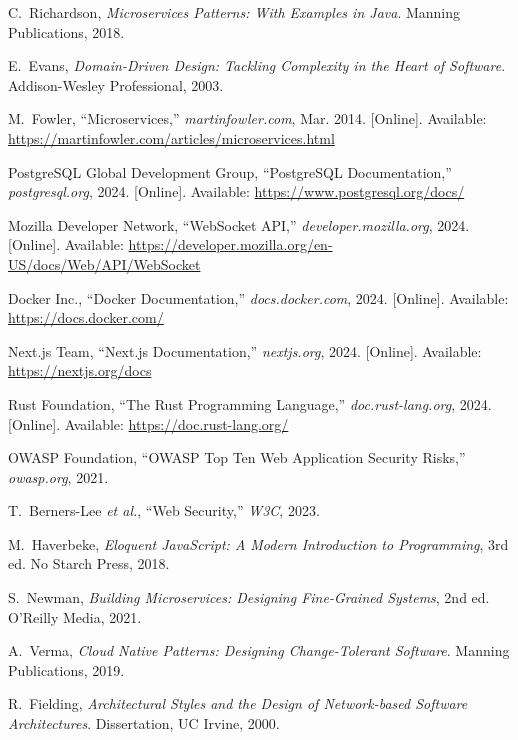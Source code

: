 \documentclass{rapportPfe}
\begin{document}
\newpage


\begin{thebibliography}{21}

C.~Richardson, \textit{Microservices Patterns: With Examples in Java}. Manning Publications, 2018.

E.~Evans, \textit{Domain-Driven Design: Tackling Complexity in the Heart of Software}. Addison-Wesley Professional, 2003.

M.~Fowler, ``Microservices,'' \textit{martinfowler.com}, Mar. 2014. [Online]. Available: \url{https://martinfowler.com/articles/microservices.html}

PostgreSQL Global Development Group, ``PostgreSQL Documentation,'' \textit{postgresql.org}, 2024. [Online]. Available: \url{https://www.postgresql.org/docs/}

Mozilla Developer Network, ``WebSocket API,'' \textit{developer.mozilla.org}, 2024. [Online]. Available: \url{https://developer.mozilla.org/en-US/docs/Web/API/WebSocket}

Docker Inc., ``Docker Documentation,'' \textit{docs.docker.com}, 2024. [Online]. Available: \url{https://docs.docker.com/}

Next.js Team, ``Next.js Documentation,'' \textit{nextjs.org}, 2024. [Online]. Available: \url{https://nextjs.org/docs}

Rust Foundation, ``The Rust Programming Language,'' \textit{doc.rust-lang.org}, 2024. [Online]. Available: \url{https://doc.rust-lang.org/}

OWASP Foundation, ``OWASP Top Ten Web Application Security Risks,'' \textit{owasp.org}, 2021.

T.~Berners-Lee \textit{et al.}, ``Web Security,'' \textit{W3C}, 2023.

M.~Haverbeke, \textit{Eloquent JavaScript: A Modern Introduction to Programming}, 3rd ed. No Starch Press, 2018.

S.~Newman, \textit{Building Microservices: Designing Fine-Grained Systems}, 2nd ed. O'Reilly Media, 2021.

A.~Verma, \textit{Cloud Native Patterns: Designing Change-Tolerant Software}. Manning Publications, 2019.

R.~Fielding, \textit{Architectural Styles and the Design of Network-based Software Architectures}. Dissertation, UC Irvine, 2000.


\end{thebibliography}
\end{document}
